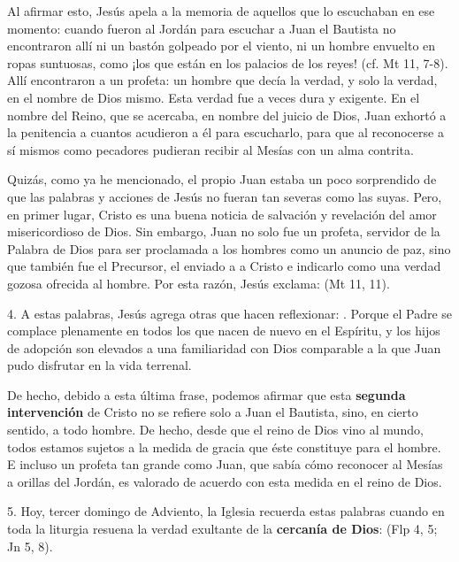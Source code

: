 Al afirmar esto, Jesús apela a la memoria de aquellos que lo escuchaban en ese momento: cuando fueron al Jordán para escuchar a Juan el Bautista no encontraron allí ni un bastón golpeado por el viento, ni un hombre envuelto en ropas suntuosas, como ¡los que están en los palacios de los reyes! (cf. Mt 11, 7-8). Allí encontraron a un profeta: un hombre que decía la verdad, y solo la verdad, en el nombre de Dios mismo. Esta verdad fue a veces dura y exigente. En el nombre del Reino, que se acercaba, en nombre del juicio de Dios, Juan exhortó a la penitencia a cuantos acudieron a él para escucharlo, para que al reconocerse a sí mismos como pecadores pudieran recibir al Mesías con un alma contrita.

Quizás, como ya he mencionado, el propio Juan estaba un poco sorprendido de que las palabras y acciones de Jesús no fueran tan severas como las suyas. Pero, en primer lugar, Cristo es una buena noticia de salvación y revelación del amor misericordioso de Dios. Sin embargo, Juan no solo fue un profeta, servidor de la Palabra de Dios para ser proclamada a los hombres como un anuncio de paz, sino que también fue el Precursor, el enviado a  a Cristo e indicarlo como una verdad gozosa ofrecida al hombre. Por esta razón, Jesús exclama:  (Mt 11, 11).

4. A estas palabras, Jesús agrega otras que hacen reflexionar: . Porque el Padre se complace plenamente en todos los que nacen de nuevo en el Espíritu, y los hijos de adopción son elevados a una familiaridad con Dios comparable a la que Juan pudo disfrutar en la vida terrenal.

De hecho, debido a esta última frase, podemos afirmar que esta \textbf{segunda intervención} de Cristo no se refiere solo a Juan el Bautista, sino, en cierto sentido, a todo hombre. De hecho, desde que el reino de Dios vino al mundo, todos estamos sujetos a la medida de gracia que éste constituye para el hombre. E incluso un profeta tan grande como Juan, que sabía cómo reconocer al Mesías a orillas del Jordán, es valorado de acuerdo con esta medida en el reino de Dios.

5. Hoy, tercer domingo de Adviento, la Iglesia recuerda estas palabras cuando en toda la liturgia resuena la verdad exultante de la \textbf{cercanía de Dios}:  (Flp 4, 5; Jn 5, 8).

